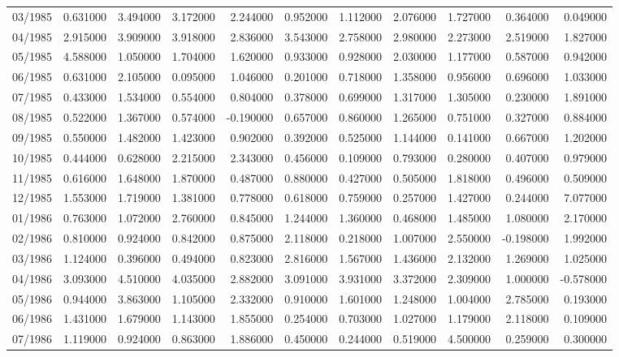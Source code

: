 \begin{tabular}{lrrrrrrrrrr}
03/1985 & 0.631000 & 3.494000 & 3.172000 & 2.244000 & 0.952000 & 1.112000 & 2.076000 & 1.727000 & 0.364000 & 0.049000 \\
04/1985 & 2.915000 & 3.909000 & 3.918000 & 2.836000 & 3.543000 & 2.758000 & 2.980000 & 2.273000 & 2.519000 & 1.827000 \\
05/1985 & 4.588000 & 1.050000 & 1.704000 & 1.620000 & 0.933000 & 0.928000 & 2.030000 & 1.177000 & 0.587000 & 0.942000 \\
06/1985 & 0.631000 & 2.105000 & 0.095000 & 1.046000 & 0.201000 & 0.718000 & 1.358000 & 0.956000 & 0.696000 & 1.033000 \\
07/1985 & 0.433000 & 1.534000 & 0.554000 & 0.804000 & 0.378000 & 0.699000 & 1.317000 & 1.305000 & 0.230000 & 1.891000 \\
08/1985 & 0.522000 & 1.367000 & 0.574000 & -0.190000 & 0.657000 & 0.860000 & 1.265000 & 0.751000 & 0.327000 & 0.884000 \\
09/1985 & 0.550000 & 1.482000 & 1.423000 & 0.902000 & 0.392000 & 0.525000 & 1.144000 & 0.141000 & 0.667000 & 1.202000 \\
10/1985 & 0.444000 & 0.628000 & 2.215000 & 2.343000 & 0.456000 & 0.109000 & 0.793000 & 0.280000 & 0.407000 & 0.979000 \\
11/1985 & 0.616000 & 1.648000 & 1.870000 & 0.487000 & 0.880000 & 0.427000 & 0.505000 & 1.818000 & 0.496000 & 0.509000 \\
12/1985 & 1.553000 & 1.719000 & 1.381000 & 0.778000 & 0.618000 & 0.759000 & 0.257000 & 1.427000 & 0.244000 & 7.077000 \\
01/1986 & 0.763000 & 1.072000 & 2.760000 & 0.845000 & 1.244000 & 1.360000 & 0.468000 & 1.485000 & 1.080000 & 2.170000 \\
02/1986 & 0.810000 & 0.924000 & 0.842000 & 0.875000 & 2.118000 & 0.218000 & 1.007000 & 2.550000 & -0.198000 & 1.992000 \\
03/1986 & 1.124000 & 0.396000 & 0.494000 & 0.823000 & 2.816000 & 1.567000 & 1.436000 & 2.132000 & 1.269000 & 1.025000 \\
04/1986 & 3.093000 & 4.510000 & 4.035000 & 2.882000 & 3.091000 & 3.931000 & 3.372000 & 2.309000 & 1.000000 & -0.578000 \\
05/1986 & 0.944000 & 3.863000 & 1.105000 & 2.332000 & 0.910000 & 1.601000 & 1.248000 & 1.004000 & 2.785000 & 0.193000 \\
06/1986 & 1.431000 & 1.679000 & 1.143000 & 1.855000 & 0.254000 & 0.703000 & 1.027000 & 1.179000 & 2.118000 & 0.109000 \\
07/1986 & 1.119000 & 0.924000 & 0.863000 & 1.886000 & 0.450000 & 0.244000 & 0.519000 & 4.500000 & 0.259000 & 0.300000 \\

\end{tabular}

